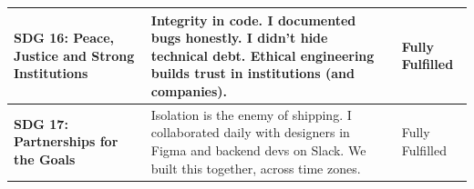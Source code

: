 \begin{longtable}{|p{5.3cm}|p{6.3cm}|p{3cm}|}
\textbf{SDG 16: Peace, Justice and Strong Institutions} & Integrity in code. I documented bugs honestly. I didn't hide technical debt. Ethical engineering builds trust in institutions (and companies). & Fully Fulfilled \\
\hline

\textbf{SDG 17: Partnerships for the Goals} & Isolation is the enemy of shipping. I collaborated daily with designers in Figma and backend devs on Slack. We built this together, across time zones. & Fully Fulfilled \\
\hline
\end{longtable}

